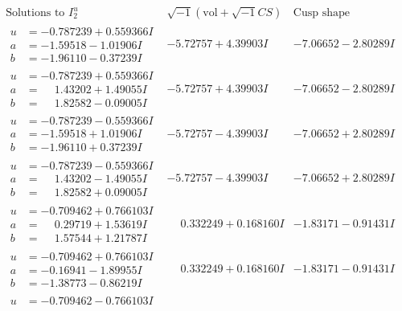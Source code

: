 \documentclass[1p]{elsarticle_modified}
\theoremstyle{definition}
\newcommand{\I}{\sqrt{-1}}
\begin{document}
$$\begin{array}{c|c|c}  
\text{Solutions to }I^u_{2}& \I (\text{vol} + \sqrt{-1}CS) & \text{Cusp shape}\\
 \hline 
\begin{aligned}
u &= -0.787239 + 0.559366 I \\
a &= -1.59518 - 1.01906 I \\
b &= -1.96110 - 0.37239 I\end{aligned}
 & -5.72757 + 4.39903 I & -7.06652 - 2.80289 I \\ \hline\begin{aligned}
u &= -0.787239 + 0.559366 I \\
a &= \phantom{-}1.43202 + 1.49055 I \\
b &= \phantom{-}1.82582 - 0.09005 I\end{aligned}
 & -5.72757 + 4.39903 I & -7.06652 - 2.80289 I \\ \hline\begin{aligned}
u &= -0.787239 - 0.559366 I \\
a &= -1.59518 + 1.01906 I \\
b &= -1.96110 + 0.37239 I\end{aligned}
 & -5.72757 - 4.39903 I & -7.06652 + 2.80289 I \\ \hline\begin{aligned}
u &= -0.787239 - 0.559366 I \\
a &= \phantom{-}1.43202 - 1.49055 I \\
b &= \phantom{-}1.82582 + 0.09005 I\end{aligned}
 & -5.72757 - 4.39903 I & -7.06652 + 2.80289 I \\ \hline\begin{aligned}
u &= -0.709462 + 0.766103 I \\
a &= \phantom{-}0.29719 + 1.53619 I \\
b &= \phantom{-}1.57544 + 1.21787 I\end{aligned}
 & \phantom{-}0.332249 + 0.168160 I & -1.83171 - 0.91431 I \\ \hline\begin{aligned}
u &= -0.709462 + 0.766103 I \\
a &= -0.16941 - 1.89955 I \\
b &= -1.38773 - 0.86219 I\end{aligned}
 & \phantom{-}0.332249 + 0.168160 I & -1.83171 - 0.91431 I \\ \hline\begin{aligned}
u &= -0.709462 - 0.766103 I \\

\end{aligned}
\end{array}$$
\end{document}

